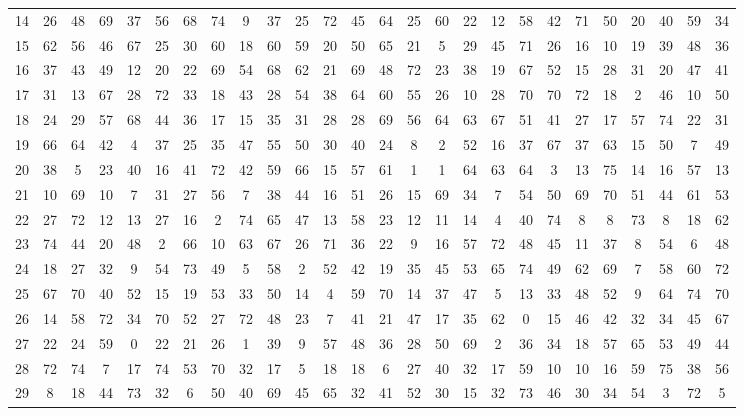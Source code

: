 \begin{table}
\begin{tabular}{c c c c c c c c c c c c c c c c c c c c c c c c c c }
14 & 26 & 48 & 69 & 37 & 56 & 68 & 74 & 9 & 37 & 25 & 72 & 45 & 64 & 25 & 60 & 22 & 12 & 58 & 42 & 71 & 50 & 20 & 40 & 59 & 34 \\
15 & 62 & 56 & 46 & 67 & 25 & 30 & 60 & 18 & 60 & 59 & 20 & 50 & 65 & 21 & 5 & 29 & 45 & 71 & 26 & 16 & 10 & 19 & 39 & 48 & 36 \\
16 & 37 & 43 & 49 & 12 & 20 & 22 & 69 & 54 & 68 & 62 & 21 & 69 & 48 & 72 & 23 & 38 & 19 & 67 & 52 & 15 & 28 & 31 & 20 & 47 & 41 \\
17 & 31 & 13 & 67 & 28 & 72 & 33 & 18 & 43 & 28 & 54 & 38 & 64 & 60 & 55 & 26 & 10 & 28 & 70 & 70 & 72 & 18 & 2 & 46 & 10 & 50 \\
18 & 24 & 29 & 57 & 68 & 44 & 36 & 17 & 15 & 35 & 31 & 28 & 28 & 69 & 56 & 64 & 63 & 67 & 51 & 41 & 27 & 17 & 57 & 74 & 22 & 31 \\
19 & 66 & 64 & 42 & 4 & 37 & 25 & 35 & 47 & 55 & 50 & 30 & 40 & 24 & 8 & 2 & 52 & 16 & 37 & 67 & 37 & 63 & 15 & 50 & 7 & 49 \\
20 & 38 & 5 & 23 & 40 & 16 & 41 & 72 & 42 & 59 & 66 & 15 & 57 & 61 & 1 & 1 & 64 & 63 & 64 & 3 & 13 & 75 & 14 & 16 & 57 & 13 \\
21 & 10 & 69 & 10 & 7 & 31 & 27 & 56 & 7 & 38 & 44 & 16 & 51 & 26 & 15 & 69 & 34 & 7 & 54 & 50 & 69 & 70 & 51 & 44 & 61 & 53 \\
22 & 27 & 72 & 12 & 13 & 27 & 16 & 2 & 74 & 65 & 47 & 13 & 58 & 23 & 12 & 11 & 14 & 4 & 40 & 74 & 8 & 8 & 73 & 8 & 18 & 62 \\
23 & 74 & 44 & 20 & 48 & 2 & 66 & 10 & 63 & 67 & 26 & 71 & 36 & 22 & 9 & 16 & 57 & 72 & 48 & 45 & 11 & 37 & 8 & 54 & 6 & 48 \\
24 & 18 & 27 & 32 & 9 & 54 & 73 & 49 & 5 & 58 & 2 & 52 & 42 & 19 & 35 & 45 & 53 & 65 & 74 & 49 & 62 & 69 & 7 & 58 & 60 & 72 \\
25 & 67 & 70 & 40 & 52 & 15 & 19 & 53 & 33 & 50 & 14 & 4 & 59 & 70 & 14 & 37 & 47 & 5 & 13 & 33 & 48 & 52 & 9 & 64 & 74 & 70 \\
26 & 14 & 58 & 72 & 34 & 70 & 52 & 27 & 72 & 48 & 23 & 7 & 41 & 21 & 47 & 17 & 35 & 62 & 0 & 15 & 46 & 42 & 32 & 34 & 45 & 67 \\
27 & 22 & 24 & 59 & 0 & 22 & 21 & 26 & 1 & 39 & 9 & 57 & 48 & 36 & 28 & 50 & 69 & 2 & 36 & 34 & 18 & 57 & 65 & 53 & 49 & 44 \\
28 & 72 & 74 & 7 & 17 & 74 & 53 & 70 & 32 & 17 & 5 & 18 & 18 & 6 & 27 & 40 & 32 & 17 & 59 & 10 & 10 & 16 & 59 & 75 & 38 & 56 \\
29 & 8 & 18 & 44 & 73 & 32 & 6 & 50 & 40 & 69 & 45 & 65 & 32 & 41 & 52 & 30 & 15 & 32 & 73 & 46 & 30 & 34 & 54 & 3 & 72 & 5 \\

\end{tabular}
\end{table}
